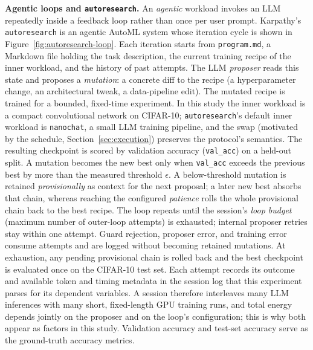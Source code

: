 \textbf{Agentic loops and \texttt{autoresearch}.} An \emph{agentic} workload invokes an LLM repeatedly inside a feedback loop rather than once per user prompt. Karpathy's \texttt{autoresearch} \cite{karpathy2026autoresearch} is an agentic AutoML system whose iteration cycle is shown in Figure~\ref{fig:autoresearch-loop}. Each iteration starts from \texttt{program.md}, a Markdown file holding the task description, the current training recipe of the inner workload, and the history of past attempts. The LLM \emph{proposer} reads this state and proposes a \emph{mutation}: a concrete diff to the recipe (\eg a hyperparameter change, an architectural tweak, a data-pipeline edit). The mutated recipe is trained for a bounded, fixed-time experiment. In this study the inner workload is a compact convolutional network on CIFAR-10; \texttt{autoresearch}'s default inner workload is \texttt{nanochat}, a small LLM training pipeline, and the swap (motivated by the schedule, Section~\ref{sec:execution}) preserves the protocol's semantics. The resulting checkpoint is scored by validation accuracy (\texttt{val\_acc}) on a held-out split. A mutation becomes the new best only when \texttt{val\_acc} exceeds the previous best by more than the measured threshold $\epsilon$. A below-threshold mutation is retained \emph{provisionally} as context for the next proposal; a later new best absorbs that chain, whereas reaching the configured \emph{patience} rolls the whole provisional chain back to the best recipe. The loop repeats until the session's \emph{loop budget} (maximum number of outer-loop attempts) is exhausted; internal proposer retries stay within one attempt. Guard rejection, proposer error, and training error consume attempts and are logged without becoming retained mutations. At exhaustion, any pending provisional chain is rolled back and the best checkpoint is evaluated once on the CIFAR-10 test set. Each attempt records its outcome and available token and timing metadata in the session log that this experiment parses for its dependent variables. A session therefore interleaves many LLM inferences with many short, fixed-length GPU training runs, and total energy depends jointly on the proposer and on the loop's configuration; this is why both appear as factors in this study. Validation accuracy and test-set accuracy serve as the ground-truth accuracy metrics.

